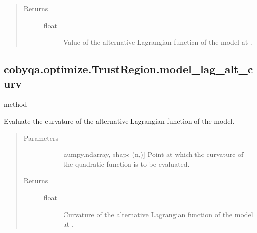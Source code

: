 \documentclass[letterpaper,10pt,english]{sphinxmanual}
\begin{document}
\begin{fulllineitems}
\begin{fulllineitems}
\begin{quote}
\begin{description}
\begin{description}
\end{description}

\item[{Returns}] \leavevmode\begin{description}
\item[{float}] \leavevmode
\sphinxAtStartPar
Value of the alternative Lagrangian function of the model at .

\end{description}

\end{description}\end{quote}

\end{fulllineitems}



\subsection{cobyqa.optimize.TrustRegion.model\_lag\_alt\_curv}
\label{\detokenize{refs/generated/cobyqa.optimize.TrustRegion.model_lag_alt_curv:cobyqa-optimize-trustregion-model-lag-alt-curv}}\label{\detokenize{refs/generated/cobyqa.optimize.TrustRegion.model_lag_alt_curv::doc}}
\sphinxAtStartPar
method

\begin{fulllineitems}
\label{\detokenize{refs/generated/cobyqa.optimize.TrustRegion.model_lag_alt_curv:cobyqa.optimize.TrustRegion.model_lag_alt_curv}}
\sphinxAtStartPar
Evaluate the curvature of the alternative Lagrangian function of the
model.
\begin{quote}\begin{description}
\item[{Parameters}] \leavevmode\begin{description}
\item[{}] \leavevmode{[}numpy.ndarray, shape (n,){]}
\sphinxAtStartPar
Point at which the curvature of the quadratic function is to be
evaluated.

\end{description}

\item[{Returns}] \leavevmode\begin{description}
\item[{float}] \leavevmode
\sphinxAtStartPar
Curvature of the alternative Lagrangian function of the model at
.


\end{description}
\end{description}
\end{quote}
\end{fulllineitems}
\end{fulllineitems}
\end{document}
